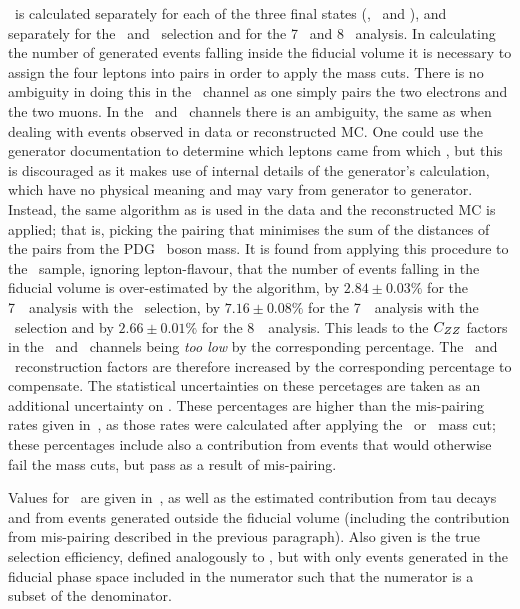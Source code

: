 \CZZ\ is calculated separately for each of the three final states (\eeee, \mmmm\
and \eemm), and separately for the \ZZ\ and \ZZs\ selection and for the 7 \tev\
and 8 \tev\ analysis. In calculating the number of generated events falling inside the fiducial volume
it is necessary to assign the four leptons into pairs in order to apply the mass
cuts. There is no ambiguity in doing this in the \eemm\ channel as one simply
pairs the two electrons and the two muons. In the \eeee\ and \mmmm\ channels
there is an ambiguity, the same as when dealing with events observed in data or
reconstructed MC. One could use the generator documentation to determine which
leptons came from which \Z, but this is discouraged as it makes use of internal
details of the generator's calculation, which have no physical meaning and may
vary from generator to generator. Instead,
the same algorithm as is used in the data and the reconstructed MC is applied; that is,
picking the pairing that minimises the sum of the distances of the pairs from
the PDG \Z\ boson mass. It is found from applying this procedure to the \eemm\
sample, ignoring lepton-flavour, that the number of events falling in the
fiducial volume is over-estimated by the algorithm, by $2.84\pm0.03\%$
for the 7~\tev\ analysis with the \ZZ\ selection, by $7.16\pm0.08\%$ for the
7~\tev\ analysis with the \ZZs\ selection and by $2.66\pm0.01\%$ for the
8~\tev\ analysis.
This leads to the  $C_{ZZ}$ factors in the
\eeee\ and \mmmm\ channels being {\it too low} by the corresponding percentage. 
The \eeee\ and \mmmm\
reconstruction factors are therefore increased by the corresponding percentage
to compensate. The statistical uncertainties on these percetages are taken as an
additional uncertainty on \CZZ. These percentages are higher than the
mis-pairing rates given in~, as those rates were calculated
after applying the \ZZ\ or \ZZs\ mass cut; these percentages include also a
contribution from events that would otherwise fail the mass cuts, but pass as a
result of mis-pairing.

Values for \CZZ\ are given
in~\tabs{objSel-czz-seven}{objSel-czz-eight}, as well as the estimated
contribution from tau decays and from events generated outside the fiducial
volume (including the contribution from mis-pairing described in the previous
paragraph).
Also given is the true selection efficiency, defined analogously to \CZZ, but
with only events generated in the fiducial phase space included in the numerator
such that the numerator is a subset of the denominator.

